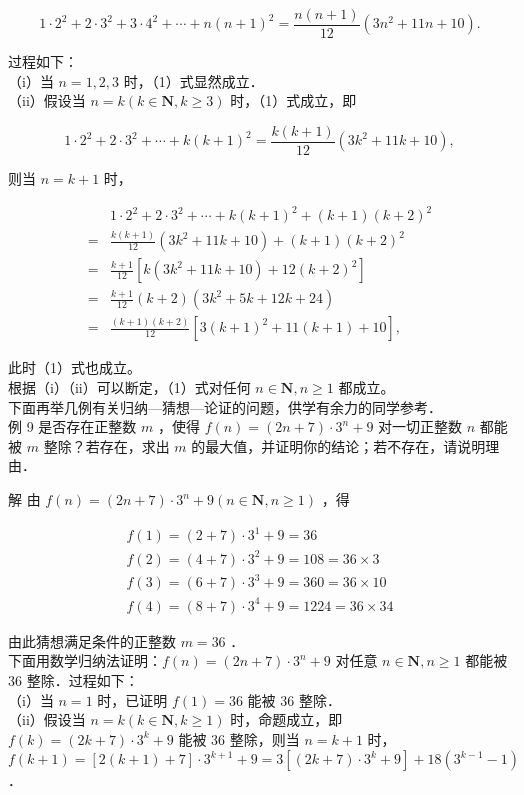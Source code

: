 \documentclass[10pt]{article}
\begin{document}
\[
1 \cdot 2^{2}+2 \cdot 3^{2}+3 \cdot 4^{2}+\cdots+n(n+1)^{2}=\frac{n(n+1)}{12}\left(3 n^{2}+11 n+10\right) .
\]

过程如下：\\
（i）当 \(n=1,2,3\) 时，（1）式显然成立．\\
（ii）假设当 \(n=k(k \in \mathbf{N}, k \geqslant 3)\) 时，（1）式成立，即

\[
1 \cdot 2^{2}+2 \cdot 3^{2}+\cdots+k(k+1)^{2}=\frac{k(k+1)}{12}\left(3 k^{2}+11 k+10\right),
\]

则当 \(n=k+1\) 时，

\[
\begin{aligned}
& 1 \cdot 2^{2}+2 \cdot 3^{2}+\cdots+k(k+1)^{2}+(k+1)(k+2)^{2} \\
= & \frac{k(k+1)}{12}\left(3 k^{2}+11 k+10\right)+(k+1)(k+2)^{2} \\
= & \frac{k+1}{12}\left[k\left(3 k^{2}+11 k+10\right)+12(k+2)^{2}\right] \\
= & \frac{k+1}{12}(k+2)\left(3 k^{2}+5 k+12 k+24\right) \\
= & \frac{(k+1)(k+2)}{12}\left[3(k+1)^{2}+11(k+1)+10\right],
\end{aligned}
\]

此时（1）式也成立。\\
根据（i）（ii）可以断定，（1）式对任何 \(n \in \mathbf{N}, n \geqslant 1\) 都成立。\\
下面再举几例有关归纳—猜想—论证的问题，供学有余力的同学参考．\\
例 9 是否存在正整数 \(m\) ，使得 \(f(n)=(2 n+7) \cdot 3^{n}+9\) 对一切正整数 \(n\) 都能被 \(m\) 整除？若存在，求出 \(m\) 的最大值，并证明你的结论；若不存在，请说明理由．

解 由 \(f(n)=(2 n+7) \cdot 3^{n}+9(n \in \mathbf{N}, n \geqslant 1)\) ，得

\[
\begin{gathered}
f(1)=(2+7) \cdot 3^{1}+9=36 \\
f(2)=(4+7) \cdot 3^{2}+9=108=36 \times 3 \\
f(3)=(6+7) \cdot 3^{3}+9=360=36 \times 10 \\
f(4)=(8+7) \cdot 3^{4}+9=1224=36 \times 34
\end{gathered}
\]

由此猜想满足条件的正整数 \(m=36\) ．\\
下面用数学归纳法证明：\(f(n)=(2 n+7) \cdot 3^{n}+9\) 对任意 \(n \in \mathbf{N}, n \geqslant 1\) 都能被 36 整除．过程如下：\\
（i）当 \(n=1\) 时，已证明 \(f(1)=36\) 能被 36 整除．\\
（ii）假设当 \(n=k(k \in \mathbf{N}, k \geqslant 1)\) 时，命题成立，即 \(f(k)=(2 k+7) \cdot 3^{k}+9\) 能被 36 整除，则当 \(n=k+1\) 时，\(f(k+1)=[2(k+1)+7] \cdot 3^{k+1}+9=3\left[(2 k+7) \cdot 3^{k}+9\right]+18\left(3^{k-1}-1\right)\) ．
\end{document}
